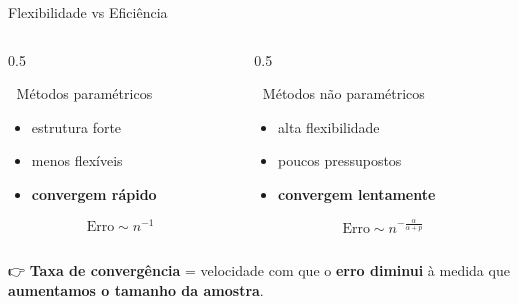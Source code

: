 \documentclass[
  ignorenonframetext,
  aspectratio=169,
]{beamer}
\providecommand{\tightlist}{%
  \setlength{\itemsep}{0pt}\setlength{\parskip}{0pt}}
\begin{document}
\begin{frame}{Flexibilidade vs Eficiência}
\label{flexibilidade-vs-eficiuxeancia}
\begin{columns}[T]
\begin{column}{0.5\linewidth}
\begin{block}{🔵 Métodos paramétricos}
\label{muxe9todos-paramuxe9tricos}
\begin{itemize}
\tightlist
\item
  estrutura forte\\
\item
  menos flexíveis\\
\item
  \textbf{convergem rápido}
\end{itemize}

\[
\text{Erro} \sim n^{-1}
\]
\end{block}
\end{column}

\begin{column}{0.5\linewidth}
\begin{block}{🔴 Métodos não paramétricos}
\label{muxe9todos-nuxe3o-paramuxe9tricos}
\begin{itemize}
\tightlist
\item
  alta flexibilidade\\
\item
  poucos pressupostos\\
\item
  \textbf{convergem lentamente}
\end{itemize}

\[
\text{Erro} \sim n^{-\frac{\alpha}{\alpha + p}}
\]
\end{block}
\end{column}
\end{columns}

👉 \textbf{Taxa de convergência} = velocidade com que o \textbf{erro
diminui} à medida que \textbf{aumentamos o tamanho da amostra}.
\end{frame}
\end{document}
